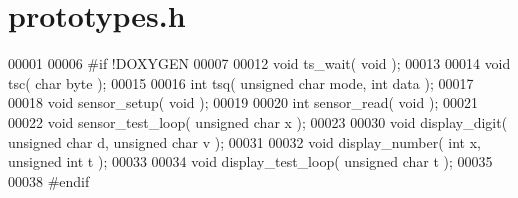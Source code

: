 \section{prototypes.h}

\begin{DoxyCode}
00001 
00006 \textcolor{preprocessor}{#if !DOXYGEN}
00007 \textcolor{preprocessor}{}
00012 \textcolor{keywordtype}{void}    ts_wait( \textcolor{keywordtype}{void} );
00013 
00014 \textcolor{keywordtype}{void}    tsc( \textcolor{keywordtype}{char} byte );
00015 
00016 \textcolor{keywordtype}{int}     tsq( \textcolor{keywordtype}{unsigned} \textcolor{keywordtype}{char} mode, \textcolor{keywordtype}{int} data );
00017 
00018 \textcolor{keywordtype}{void}    sensor_setup( \textcolor{keywordtype}{void} );
00019 
00020 \textcolor{keywordtype}{int}     sensor_read( \textcolor{keywordtype}{void} );
00021 
00022 \textcolor{keywordtype}{void}    sensor_test_loop( \textcolor{keywordtype}{unsigned} \textcolor{keywordtype}{char} x );
00023 
00030 \textcolor{keywordtype}{void} display_digit( \textcolor{keywordtype}{unsigned} \textcolor{keywordtype}{char} d, \textcolor{keywordtype}{unsigned} \textcolor{keywordtype}{char} v );
00031 
00032 \textcolor{keywordtype}{void} display_number( \textcolor{keywordtype}{int} x, \textcolor{keywordtype}{unsigned} \textcolor{keywordtype}{int} t );
00033 
00034 \textcolor{keywordtype}{void} display_test_loop( \textcolor{keywordtype}{unsigned} \textcolor{keywordtype}{char} t );
00035 
00038 \textcolor{preprocessor}{#endif}
\end{DoxyCode}
